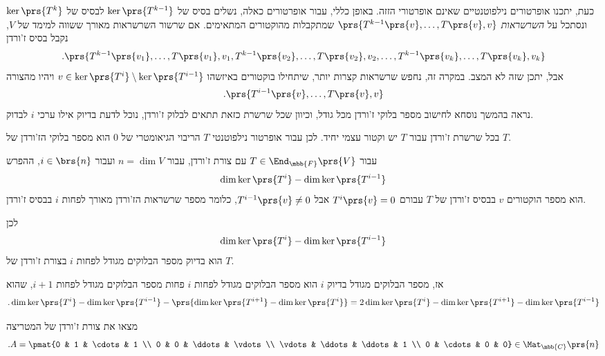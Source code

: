\documentclass[a4paper,10pt,twoside,openany]{book}
\begin{document}
כעת, יתכנו אופרטורים נילפוטנטיים שאינם אופרטורי הזזה. באופן כללי, עבור אופרטורים כאלה, נשלים בסיס של
$\ker\prs{T^{k-1}}$
לבסיס של
$\ker\prs{T^k}$
ונסתכל על
\emph{השרשראות}
$\prs{T^{k-1}\prs{v}, \ldots, T\prs{v}, v}$
שמתקבלות מהוקטורים המתאימים. אם שרשור השרשראות מאורך ששווה למימד של
$V$,
נקבל בסיס ז'ורדן
\[\text{.}\prs{T^{k-1}\prs{v_1}, \ldots, T\prs{v_1}, v_1, T^{k-1}\prs{v_2}, \ldots, T\prs{v_2}, v_2, \ldots, T^{k-1}\prs{v_k}, \ldots, T\prs{v_k}, v_k}\]
אבל, יתכן שזה לא המצב. במקרה זה, נחפש שרשראות קצרות יותר, שיתחילו בוקטורים באיזשהו
$v \in \ker\prs{T^i} \setminus \ker\prs{T^{i-1}}$
ויהיו מהצורה
\[\text{.} \prs{T^{i-1}\prs{v}, \ldots, T\prs{v}, v}\]
נראה בהמשך נוסחא לחישוב מספר בלוקי ז'ורדן מכל גודל, וכיוון שכל שרשרת כזאת תתאים לבלוק ז'ורדן, נוכל לדעת בדיוק אילו ערכי
$i$
לבדוק.

\begin{remark}
בכל שרשרת ז'ורדן עבור
$T$
יש וקטור עצמי יחיד. לכן עבור אופרטור נילפוטנטי $T$ הריבוי הגיאומטרי של
$0$
הוא מספר בלוקי הז'ורדן של
$T$.
\end{remark}

\begin{remark}
עבור
$T \in \End_{\mbb{F}}\prs{V}$
עם צורת ז'ורדן, עבור
$n = \dim V$
ועבור
$i \in \brs{n}$,
ההפרש
\[\dim \ker\prs{T^i} - \dim \ker\prs{T^{i-1}}\]
הוא מספר הוקטורים
$v$
בבסיס ז'ורדן של
$T$
עבורם
$T^i\prs{v} = 0$
אבל
$T^{i-1}\prs{v} \neq 0$,
כלומר מספר שרשראות הז'ורדן מאורך לפחות
$i$
בבסיס ז'ורדן.

לכן
\[\dim \ker\prs{T^i} - \dim \ker\prs{T^{i-1}}\]
הוא בדיוק מספר הבלוקים מגודל לפחות
$i$
בצורת ז'ורדן של
$T$.

אז, מספר הבלוקים מגודל בדיוק
$i$
הוא מספר הבלוקים מגודל לפחות
$i$
פחות מספר הבלוקים מגודל לפחות
$i+1$,
שהוא
\[\text{.} \dim \ker\prs{T^i} - \dim \ker\prs{T^{i-1}} - \prs{\dim \ker\prs{T^{i+1}} - \dim \ker\prs{T^i}} = 2 \dim\ker\prs{T^i} - \dim\ker\prs{T^{i+1}} - \dim\ker\prs{T^{i-1}}\]
\end{remark}

\begin{exercisechap}
מצאו את צורת ז'ורדן של המטריצה
\begin{align*}
\text{.} A = \pmat{0 & 1 & \cdots & 1 \\ 0 & 0 & \ddots & \vdots \\ \vdots & \ddots & \ddots & 1 \\ 0 & \cdots & 0 & 0} \in \Mat_{\mbb{C}}\prs{n}
\end{align*}
\end{exercisechap}
\end{document}
